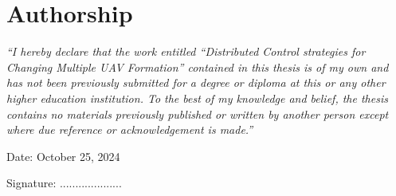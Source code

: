\chapter*{Authorship}
\textit{``I hereby declare that the work entitled ``Distributed Control strategies for Changing Multiple UAV Formation'' contained in this thesis is of my own and has not been previously submitted for a degree or diploma at this or any other higher education institution. To the best of my knowledge and belief, the thesis contains no materials previously published or written by another person except where due reference or acknowledgement is made.''
}
\vspace{0.5cm}

\begin{flushleft}
    Date: October 25, 2024\quad\par

    \vspace{0.5cm}
    
    Signature: ....................
\end{flushleft}